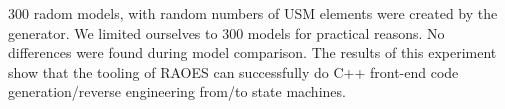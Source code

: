 
300 radom models, with random numbers of USM elements were created by the generator. 
We limited ourselves to 300 models for practical reasons. 
No differences were found during model comparison. 
The results of this experiment show that the tooling of RAOES can successfully do C++ front-end code generation/reverse engineering from/to state machines. 

%

%

%


%